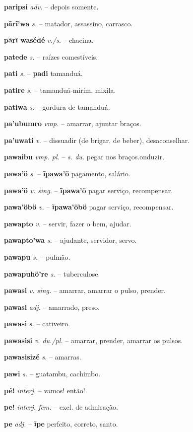 \textbf{paripsi} \textit{adv.} -- depois somente.

\textbf{pãrĩ'wa} \textit{s.} -- matador, assassino, carrasco.

\textbf{pãrĩ wasédé} \textit{v./s.} -- chacina.

\textbf{patede} \textit{s.} -- raízes comestíveis.

\textbf{pati} \textit{s.} -- \textbf{padi} tamanduá.

\textbf{patire} \textit{s.} -- tamanduá-mirim, mixila.

\textbf{patiwa} \textit{s.} -- gordura de tamanduá.

\textbf{pa'ubumro} \textit{vmp.} -- amarrar, ajuntar braços.

\textbf{pa'uwati} \textit{v.} -- dissuadir (de brigar, de beber), desaconselhar.

\textbf{pawaibu} \textit{vmp. pl.} -- \textit{s. du.} pegar nos braços.onduzir.

\textbf{pawa'ö} \textit{s.} -- \textbf{ĩpawa'ö} pagamento, salário.

\textbf{pawa'ö} \textit{v. sing.} -- \textbf{ĩpawa'ö} pagar serviço, recompensar.

\textbf{pawa'öbö} \textit{v.} -- \textbf{ĩpawa'öbö} pagar serviço, recompensar.

\textbf{pawapto} \textit{v.} -- servir, fazer o bem, ajudar.

\textbf{pawapto'wa} \textit{s.} -- ajudante, servidor, servo.

\textbf{pawapu} \textit{s.} -- pulmão.

\textbf{pawapuhö're} \textit{s.} -- tuberculose.

\textbf{pawasi} \textit{v. sing.} -- amarrar, amarrar o pulso, prender.

\textbf{pawasi} \textit{adj.} -- amarrado, preso.

\textbf{pawasi} \textit{s.} -- cativeiro.

\textbf{pawasisi} \textit{v. du./pl.} -- amarrar, prender, amarrar os pulsos.

\textbf{pawasisizé} \textit{s.} -- amarras.

\textbf{pawi} \textit{s.} -- guatambu, cachimbo.

\textbf{pé!} \textit{interj.} -- vamos! então!.

\textbf{pe!} \textit{interj. fem.} -- excl. de admiração.

\textbf{pe} \textit{adj.} -- \textbf{ĩpe} perfeito, correto, santo.

